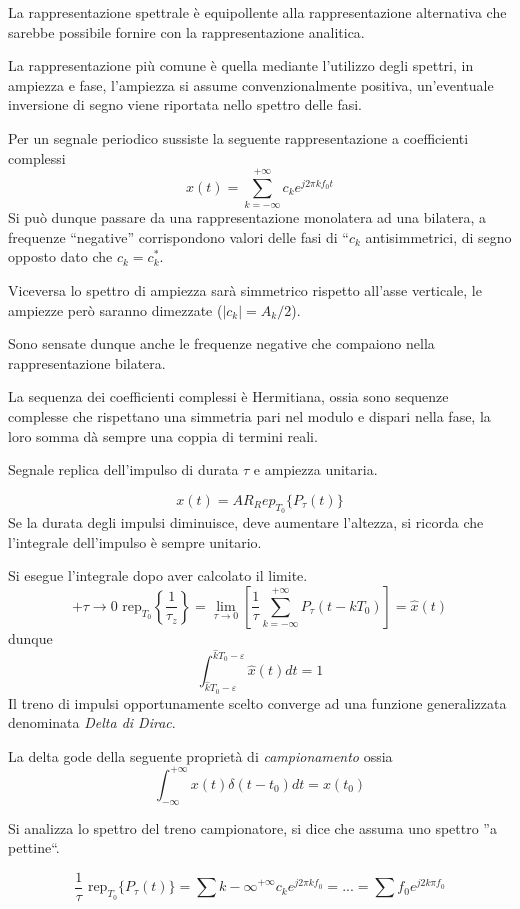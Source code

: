 
La rappresentazione spettrale è equipollente alla rappresentazione alternativa
che sarebbe possibile fornire con la rappresentazione analitica.

La rappresentazione più comune è quella mediante l'utilizzo degli spettri, in
ampiezza e fase, l'ampiezza si assume convenzionalmente positiva, un'eventuale
inversione di segno viene riportata nello spettro delle fasi.

Per un segnale periodico sussiste la seguente rappresentazione a coefficienti
complessi
$$
x(t) = \sum_{k=-\infty}^{+\infty} c_k e^{j 2\pi k f_0 t}
$$
Si può dunque passare da una rappresentazione monolatera ad una bilatera, a
frequenze ``negative'' corrispondono valori delle fasi di ``$c_k$
antisimmetrici, di segno opposto dato che $c_k = c_k^*$.

Viceversa lo spettro di ampiezza sarà simmetrico rispetto all'asse verticale,
le ampiezze però saranno dimezzate ($|c_k| = A_k/2$).

Sono sensate dunque anche le frequenze negative che compaiono nella
rappresentazione bilatera.

La sequenza dei coefficienti complessi è Hermitiana, ossia sono sequenze
complesse che rispettano una simmetria pari nel modulo e dispari nella fase, la
loro somma dà sempre una coppia di termini reali.


Segnale replica dell'impulso di durata $\tau$ e ampiezza unitaria.


$$
x(t)=AR_Rep_{T_0}\{P_\tau(t)\}
$$
Se la durata degli impulsi diminuisce, deve aumentare l'altezza, si ricorda che
l'integrale dell'impulso è sempre unitario.

Si esegue l'integrale dopo aver calcolato il limite.
$$
+{\tau\to0} \text{ rep}_{T_0} \left\{\frac{1}{\tau_z}\right\} = \lim_{\tau \to
0}
\left[ \frac{1}{\tau} \sum_{k=-\infty}^{+\infty}  P_\tau(t-kT_0) \right] =
\hat{x}(t)
$$
dunque
$$
\int_{\hat{k}T_0-\varepsilon}^{\hat{k}T_0-\varepsilon} \hat{x}(t)dt = 1
$$
Il treno di impulsi opportunamente scelto converge ad una funzione
generalizzata denominata \textit{Delta di Dirac}.

La delta gode della seguente proprietà di \textit{campionamento}
ossia
$$
\int_{-\infty}^{+\infty} x(t)
\delta(t-t_0) dt = x(t_0)
$$

Si analizza lo spettro del treno campionatore, si dice che assuma uno spettro
''a pettine``.

$$
\frac{1}{\tau} \text{ rep}_{T_0} \{P_\tau(t)\} = \sum{k-\infty}^{+\infty} c_k
e^{j2\pi k f_0} = ... = \sum f_0e^{j2k\pi f_0}
$$

